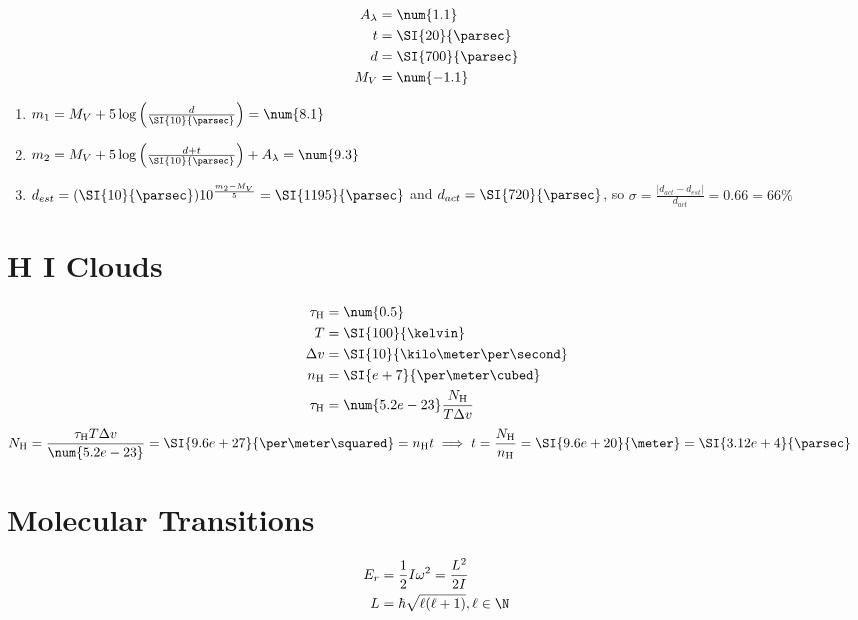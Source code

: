 \documentclass{article}
\begin{document}
\begin{align}
    A_\lambda &= \num{1.1} \\
    t &= \SI{20}{\parsec} \\
    d &= \SI{700}{\parsec} \\
    M_V &= \num{-1.1}
\end{align}
\begin{enumerate}
    \item \(m_1 = M_V + 5\log\left(\frac{d}{\SI{10}{\parsec}}\right) = \num{8.1}\)
    \item \(m_2 = M_V + 5\log\left(\frac{d + t}{\SI{10}{\parsec}}\right) + A_\lambda = \num{9.3}\)
    \item \(d_{est} = (\SI{10}{\parsec}) 10^{\frac{m_2 - M_V}{5}} = \SI{1195}{\parsec}\) and \(d_{act} = \SI{720}{\parsec}\), so \(\sigma = \frac{|d_{act} - d_{est}|}{d_{act}} = \num{0.66} = \num{66}\%\)
\end{enumerate}

\section{H I Clouds}

\begin{align}
    \tau_{\ce{H}} &= \num{0.5} \\
    T &= \SI{100}{\kelvin} \\
    \Delta v &= \SI{10}{\kilo\meter\per\second} \\
    n_{\ce{H}} &= \SI{e+7}{\per\meter\cubed} \\
    \tau_{\ce{H}} &= \num{5.2e-23} \frac{N_{\ce{H}}}{T \Delta v}
\end{align}
\begin{align}
    N_{\ce{H}} &= \frac{\tau_{\ce{H}} T \Delta v}{\num{5.2e-23}} = \SI{9.6e+27}{\per\meter\squared} = n_{\ce{H}} t \implies t = \frac{N_{\ce{H}}}{n_{\ce{H}}} = \SI{9.6e+20}{\meter} = \SI{3.12e+4}{\parsec}
\end{align}

\section{Molecular Transitions}

\begin{align}
    E_r &= \frac{1}{2} I \omega^2 = \frac{L^2}{2I} \\
    L &= \hbar \sqrt{\ell (\ell + 1)}, \ell \in \N
\end{align}

\subsection{}
\end{document}
